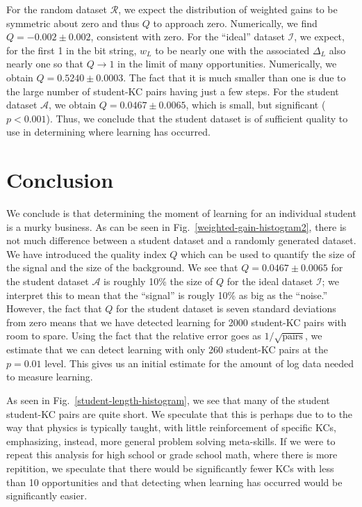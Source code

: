\documentclass{acmlarge-edm}
\begin{document}
For the random dataset $\mathcal{R}$, we expect the distribution of 
weighted gains to be symmetric about zero and thus $Q$ to approach zero.  
Numerically, we find  $Q=-0.002\pm0.002$, consistent with zero.
For the ``ideal'' dataset $\mathcal{I}$,
we expect, for the first 1 in the bit string, $w_L$ to be nearly one 
with the associated $\Delta_L$ also nearly one so that $Q\to 1$ in
the limit of many opportunities.
Numerically, we obtain $Q=0.5240\pm0.0003$.  The fact that it
is much smaller than one is due to the 
large number of student-KC pairs having just a few steps.  
For the student dataset $\mathcal{A}$, we obtain $Q=0.0467\pm0.0065$, which
is small, but significant ($p<0.001$). Thus, we conclude that the
student dataset is of sufficient quality to use in determining where learning has occurred.


\section{Conclusion}

We conclude is that determining the moment of learning for an 
individual student is a murky business.  As can be seen in
Fig.~\ref{weighted-gain-histogram2},  there is not much difference
between a student dataset and a randomly generated dataset.  
 We have introduced the quality index $Q$ which can be used to
quantify the size of the signal and the size of the background.  We
see that $Q=0.0467\pm0.0065$ for the student dataset $\mathcal{A}$ is 
roughly 10\% the size of $Q$ for the ideal dataset $\mathcal{I}$;  we
interpret this to mean that the ``signal'' is rougly 10\% as big as
the ``noise.''  However, the fact that $Q$ for the student dataset is
seven standard deviations from zero means that we have
detected learning for 2000 student-KC pairs with room to spare.  
Using the fact that the relative error goes as
$1/\sqrt{\mbox{pairs}}$, we estimate that we can detect learning with only 260
student-KC pairs at the $p=0.01$ level.  This gives us an initial estimate for the amount of
log data needed to measure learning.


As seen in Fig.~\ref{student-length-histogram}, we see that many of the student 
student-KC pairs are quite short.  We speculate that this is perhaps
due to to the way that physics is typically taught, with little
reinforcement of specific KCs, emphasizing, instead, more general
problem solving meta-skills.  If we were to repeat this analysis for
high school or grade school math, where there is more repitition, we
speculate that there would be significantly fewer KCs with less than
10 opportunities and that detecting when learning has occurred
would be significantly easier.




\end{document}
